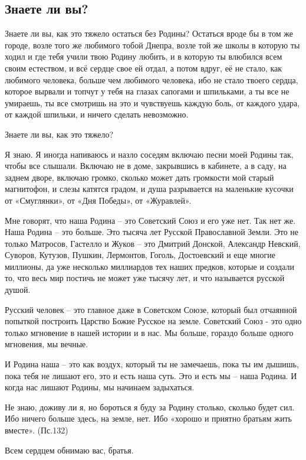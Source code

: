  
 
 
 
 
\subsection{Знаете ли вы?}
\label{sec:25_04_2021.fb.volga_vasilij.1.rodina}

Знаете ли вы, как это тяжело остаться без Родины? Остаться вроде бы в том же
городе, возле того же любимого тобой Днепра, возле той же школы в которую ты
ходил и где тебя учили твою Родину любить, и в которую ты влюбился всем своим
естеством, и всё сердце свое ей отдал, а потом вдруг, её не стало, как любимого
человека, больше чем любимого человека, ибо не стало твоего сердца, которое
вырвали и топчут у тебя на глазах сапогами и шпильками, а ты все не умираешь,
ты все смотришь на это и чувствуешь каждую боль, от каждого удара, от каждой
шпильки, и ничего сделать невозможно. 

Знаете ли вы, как это тяжело?

Я знаю. Я иногда напиваюсь и назло соседям включаю песни моей Родины так, чтобы
все слышали. Включаю не в доме, закрывшись в кабинете, а в саду, на заднем
дворе, включаю громко, сколько может дать громкости мой старый магнитофон, и
слезы катятся градом, и душа разрывается на маленькие кусочки от «Смуглянки»,
от «Дня Победы», от «Журавлей». 

Мне говорят, что наша Родина – это Советский Союз и его уже нет. Так нет же.
Наша Родина – это больше. Это тысяча лет Русской Православной Земли. Это не
только Матросов, Гастелло и Жуков – это Дмитрий Донской, Александр Невский,
Суворов, Кутузов, Пушкин, Лермонтов, Гоголь, Достоевский и еще многие миллионы,
да уже несколько миллиардов тех наших предков, которые и создали то, что весь
мир постичь не может уже тысячу лет, и что называется русской душой. 

Русский человек – это главное даже в Советском Союзе, который был отчаянной
попыткой построить Царство Божие Русское на земле. Советский Союз - это одно
только мгновение в нашей истории и в нас. Мы больше, гораздо больше одного
мгновения, мы вечные. 

И Родина наша – это как воздух, который ты не замечаешь, пока ты им дышишь,
пока тебя не лишают его, это и есть наша суть. Это и есть мы – наша Родина. И
когда нас лишают Родины, мы начинаем задыхаться.

Не знаю, доживу ли я, но бороться я буду за Родину столько, сколько будет сил.
Ибо ничего больше здесь, на земле, нет. Ибо «хорошо и приятно братьям жить
вместе». (Пс.132)

Всем сердцем обнимаю вас, братья.

